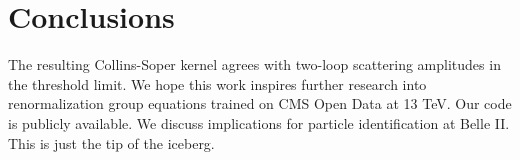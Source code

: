 \section{Conclusions}\label{sec:conclusions}

The resulting Collins-Soper kernel agrees with two-loop scattering
amplitudes in the threshold limit. We hope this work inspires further
research into renormalization group equations trained on CMS Open Data
at 13 TeV. Our code is publicly available. We discuss implications for
particle identification at Belle II. This is just the tip of the
iceberg.

